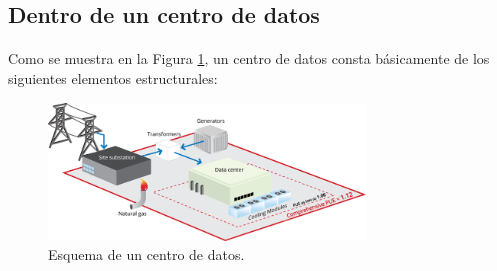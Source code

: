 \documentclass[12pt]{article}
\begin{document}
    \subsection{Dentro de un centro de datos}
			\paragraph{}
            Como se muestra en la Figura \ref{image:datacenter}, un centro de datos consta básicamente de los siguientes elementos estructurales:
                        
            \begin{figure}[htpb!]
				\begin{center}
					\includegraphics[width=0.75\textwidth]{pue-comprehensive}
					\caption{Esquema de un centro de datos.\cite{google:dc-schema}}
					\label{image:datacenter}
				\end{center}
			\end{figure}
            
\end{document}
